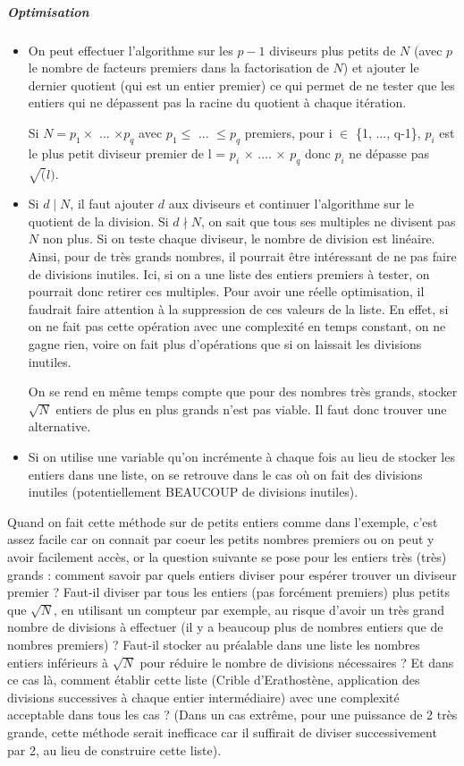 \documentclass[11pt,a4paper]{article}
\begin{document}
	\subparagraph{Optimisation}
	\begin{itemize}	
		\item On peut effectuer l'algorithme sur les $p-1$ diviseurs plus petits de $N$ (avec $p$ le nombre de facteurs premiers dans la factorisation de $N$) et ajouter le dernier quotient (qui est un entier premier) ce qui permet de ne tester que les entiers qui ne dépassent pas la racine du quotient à chaque itération.
		
		Si $N = p_1 \times$ ... $\times p_q$ avec $p_1 \leq$ ... $\leq p_q$ premiers, pour i $\in$ \{1, ..., q-1\}, $p_i$ est le plus petit diviseur premier de l = $p_i$ $\times$ .... $\times$ $p_q$ donc $p_i$ ne dépasse pas $\sqrt(l)$.
		
		\item Si $d \mid N$, il faut ajouter $d$ aux diviseurs et continuer l'algorithme sur le quotient de la division. Si $d \nmid N$, on sait que tous ses multiples ne divisent pas $N$ non plus. Si on teste chaque diviseur, le nombre de division est linéaire. Ainsi, pour de très grands nombres, il pourrait être intéressant de ne pas faire de divisions inutiles. Ici, si on a une liste des entiers premiers à tester, on pourrait donc retirer ces multiples. Pour avoir une réelle optimisation, il faudrait faire attention à la suppression de ces valeurs de la liste. En effet, si on ne fait pas cette opération avec une complexité en temps constant, on ne gagne rien, voire on fait plus d'opérations que si on laissait les divisions inutiles. 
		
		On se rend en même temps compte que pour des nombres très grands, stocker $\sqrt{N}$ entiers de plus en plus grands n'est pas viable. Il faut donc trouver une alternative.
		
		\item Si on utilise une variable qu'on incrémente à chaque fois au lieu de stocker les entiers dans une liste, on se retrouve dans le cas où on fait des divisions inutiles (potentiellement BEAUCOUP de divisions inutiles).
	\end{itemize}
	
	
	Quand on fait cette méthode sur de petits entiers comme dans l'exemple, c'est assez facile car on connait par coeur les petits nombres premiers ou on peut y avoir facilement accès, or la question suivante se pose pour les entiers très (très) grands : comment savoir par quels entiers diviser pour espérer trouver un diviseur premier ? Faut-il diviser par tous les entiers (pas forcément premiers) plus petits que $\sqrt{N}$, en utilisant un compteur par exemple, au risque d'avoir un très grand nombre de divisions à effectuer (il y a beaucoup plus de nombres entiers que de nombres premiers) ? Faut-il stocker au préalable dans une liste les nombres entiers inférieurs à $\sqrt{N}$ pour réduire le nombre de divisions nécessaires ? Et dans ce cas là, comment établir cette liste (Crible d'Erathostène, application des divisions successives à chaque entier intermédiaire) avec une complexité acceptable dans tous les cas ? (Dans un cas extrême, pour une puissance de 2 très grande, cette méthode serait inefficace car il suffirait de diviser successivement par 2, au lieu de construire cette liste).
	
\end{document}
